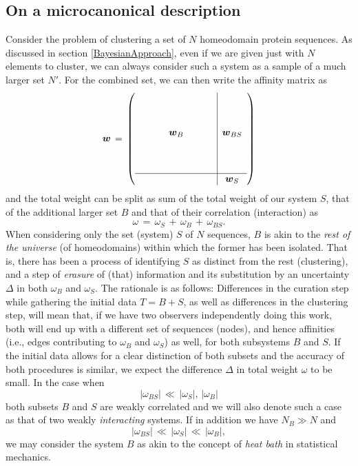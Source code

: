 \documentclass[twocolumn,aps,sort,nofootinbib]{revtex4}
\begin{document}
\subsection{On a microcanonical description}
Consider the problem of clustering a set of $N$ homeodomain protein sequences.
As discussed in section \ref{BayesianApproach}, 
even if we are given just with $N$ elements to cluster, we can always consider
such a system as a sample of a much larger set $N'$.
For the combined set, we can then write the affinity matrix as
\begin{equation}
\boldsymbol{w}\,=\,
\left(
\begin{array}{ccccccc|c}
 & & & & & & & \\
 & & & & & & & \\
 & & & & & & & \\
 & & & \boldsymbol{w}_B & & & & \boldsymbol{w}_{BS} \\
 & & & & & & & \\
 & & & & & & & \\
 & & & & & & & \\\hline
 & & & & & & & \boldsymbol{w}_S 
\end{array}
\right)\nonumber
\end{equation}
and the total weight can be split as sum of the total weight of
our system $S$, that of the additional larger set $B$ and that of
their correlation (interaction) as  
\begin{equation}
\omega\,=\,\omega_S\,+\,\omega_B\,+\,\omega_{BS}.
\end{equation}
When considering only the set (system) $S$ of $N$ sequences,
$B$ is akin to the {\sl rest of the universe} (of homeodomains)
within which the former has been isolated. That is, there has been
a process of identifying $S$ as distinct from the rest (clustering),
and a step of {\sl erasure} of (that) information 
and its substitution by an uncertainty $\Delta$ in both $\omega_B$ and $\omega_S$.
The rationale is as follows: Differences in the curation step while gathering the initial data $T=B+S$,
as well as differences in the clustering step, will mean that, if we
have two observers independently doing this work, both will end up with
a different set of sequences (nodes), and hence affinities 
(i.e., edges contributing to $\omega_B$ and $\omega_S$) as well,
for both subsystems $B$ and $S$. If the initial data allows for a clear distinction of both
subsets
and the accuracy of both procedures is similar, we expect the difference $\Delta$ 
in total weight $\omega$ to be  small. 
In the case when
\begin{equation}\label{WeaklyInteractingSystems}
|\omega_{BS}|\,\ll\,|\omega_S| ,\,|\omega_B|
\end{equation}
both subsets $B$ and $S$ are weakly correlated 
and we will also denote such a case as that of two weakly {\sl interacting} systems.
If in addition we have $N_B\gg N$ and
\begin{equation}\label{HeatBathCondition}
|\omega_{BS}|\,\ll\,|\omega_S|\,\ll\,|\omega_B|,
\end{equation} 
we may consider the system $B$
as akin to the concept of {\sl heat bath} in statistical mechanics.
\end{document}
